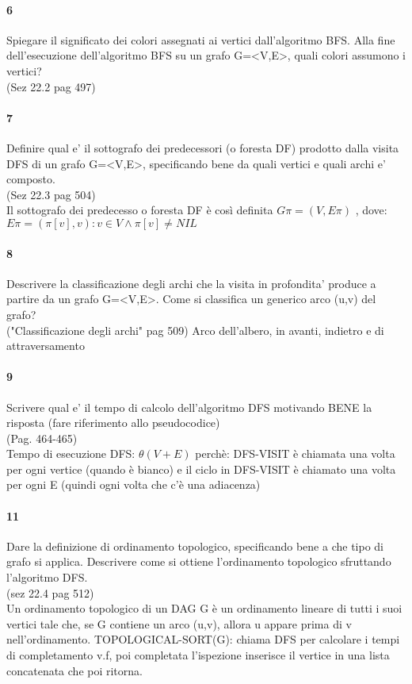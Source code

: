 \documentclass[12pt, a4paper, openany]{book}
\begin{document}
    \paragraph{6}
    Spiegare il significato dei colori assegnati ai vertici dall’algoritmo BFS. Alla
    fine dell’esecuzione dell’algoritmo BFS su un grafo G=<V,E>, quali colori
    assumono i vertici?\\
    (Sez 22.2 pag 497)

    \paragraph{7}
    Definire qual e’ il sottografo dei predecessori (o foresta DF) prodotto dalla
    visita DFS di un grafo G=<V,E>, specificando bene da quali vertici e quali
    archi e’ composto.\\
    (Sez 22.3 pag 504)\\
    Il sottografo dei predecesso o foresta DF è così definita $G\pi = (V, E\pi )$ , dove:
$E\pi = {(\pi[v], v) : v \in V \land \pi[v] \neq NIL}$
    \paragraph{8}
    Descrivere la classificazione degli archi che la visita in profondita’ produce a
    partire da un grafo G=<V,E>. Come si classifica un generico arco (u,v) del
    grafo?\\
    ("Classificazione degli archi" pag 509)
    Arco dell'albero, in avanti, indietro e di attraversamento
    \paragraph{9}
    Scrivere qual e’ il tempo di calcolo dell’algoritmo DFS motivando BENE la
    risposta (fare riferimento allo pseudocodice)\\
    (Pag. 464-465)\\
    Tempo di esecuzione DFS: $\theta(V+E)$ perchè: DFS-VISIT è chiamata una volta per ogni vertice (quando è bianco) e il ciclo in DFS-VISIT è chiamato una volta per ogni E (quindi ogni volta che c'è una adiacenza)
\paragraph{11}
Dare la definizione di ordinamento topologico, specificando bene a che tipo di
grafo si applica. Descrivere come si ottiene l’ordinamento topologico
sfruttando l’algoritmo DFS.\\
(sez 22.4 pag 512)\\
Un ordinamento topologico di un DAG G è un ordinamento lineare di tutti i suoi vertici tale che, se G contiene un arco (u,v), allora u appare prima di v nell'ordinamento.
TOPOLOGICAL-SORT(G): chiama DFS per calcolare i tempi di completamento v.f, poi completata l'ispezione inserisce il vertice in una lista concatenata che poi ritorna.
\end{document}
